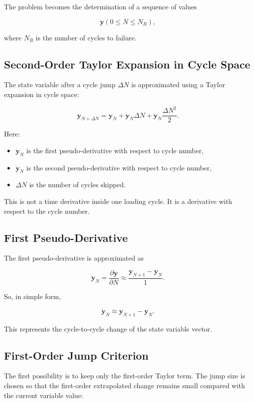 ﻿\documentclass[11pt,a4paper]{article}
\begin{document}
The problem becomes the determination of a sequence of values

\[
\bm{y}(0 \leq N \leq N_R),
\]

where $N_R$ is the number of cycles to failure.

\subsection{Second-Order Taylor Expansion in Cycle Space}

The state variable after a cycle jump $\Delta N$ is approximated using a Taylor expansion in cycle space:

\[
\bm{y}_{N+\Delta N}
=
\bm{y}_{N}
+
\dot{\bm{y}}_{N}\Delta N
+
\ddot{\bm{y}}_{N}
\frac{\Delta N^2}{2}.
\]

Here:

\begin{itemize}[leftmargin=*]
    \item $\dot{\bm{y}}_N$ is the first pseudo-derivative with respect to cycle number,
    \item $\ddot{\bm{y}}_N$ is the second pseudo-derivative with respect to cycle number,
    \item $\Delta N$ is the number of cycles skipped.
\end{itemize}

This is not a time derivative inside one loading cycle. It is a derivative with respect to the cycle number.

\subsection{First Pseudo-Derivative}

The first pseudo-derivative is approximated as

\[
\dot{\bm{y}}_N
=
\frac{\partial \bm{y}}{\partial N}
\approx
\frac{\bm{y}_{N+1}-\bm{y}_{N}}{1}.
\]

So, in simple form,

\[
\dot{\bm{y}}_N
\approx
\bm{y}_{N+1}-\bm{y}_{N}.
\]

This represents the cycle-to-cycle change of the state variable vector.

\subsection{First-Order Jump Criterion}

The first possibility is to keep only the first-order Taylor term. The jump size is chosen so that the first-order extrapolated change remains small compared with the current variable value:
\end{document}
